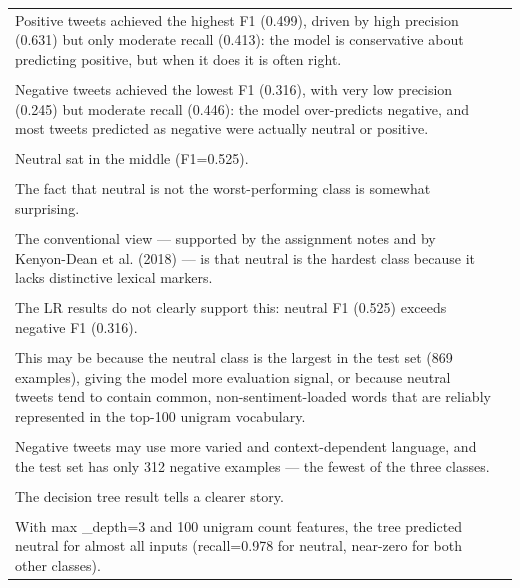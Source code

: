 \documentclass[11pt]{article}
\begin{document}
\begin{longtable}{|p{}|p{}|}
\hline
\rule{0pt}{3.5cm} & \\
\hline
Positive tweets achieved the highest F1 (0.499), driven by high precision (0.631) but only moderate recall (0.413): the model is conservative about predicting positive, but when it does it is often right. & \\[2pt]
\hline
\rule{0pt}{3.5cm} & \\
\hline
Negative tweets achieved the lowest F1 (0.316), with very low precision (0.245) but moderate recall (0.446): the model over-predicts negative, and most tweets predicted as negative were actually neutral or positive. & \\[2pt]
\hline
\rule{0pt}{3.5cm} & \\
\hline
Neutral sat in the middle (F1=0.525). & \\[2pt]
\hline
\rule{0pt}{3.5cm} & \\
\hline
The fact that neutral is not the worst-performing class is somewhat surprising. & \\[2pt]
\hline
\rule{0pt}{3.5cm} & \\
\hline
The conventional view --- supported by the assignment notes and by Kenyon-Dean et al. (2018) --- is that neutral is the hardest class because it lacks distinctive lexical markers. & \\[2pt]
\hline
\rule{0pt}{3.5cm} & \\
\hline
The LR results do not clearly support this: neutral F1 (0.525) exceeds negative F1 (0.316). & \\[2pt]
\hline
\rule{0pt}{3.5cm} & \\
\hline
This may be because the neutral class is the largest in the test set (869 examples), giving the model more evaluation signal, or because neutral tweets tend to contain common, non-sentiment-loaded words that are reliably represented in the top-100 unigram vocabulary. & \\[2pt]
\hline
\rule{0pt}{3.5cm} & \\
\hline
Negative tweets may use more varied and context-dependent language, and the test set has only 312 negative examples --- the fewest of the three classes. & \\[2pt]
\hline
\rule{0pt}{3.5cm} & \\
\hline
The decision tree result tells a clearer story. & \\[2pt]
\hline
\rule{0pt}{3.5cm} & \\
\hline
With max \_depth=3 and 100 unigram count features, the tree predicted neutral for almost all inputs (recall=0.978 for neutral, near-zero for both other classes). & \\[2pt]

\end{longtable}
\end{document}
